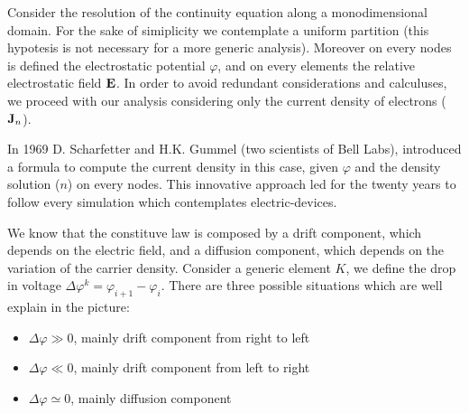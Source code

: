 Consider the resolution of the continuity equation along a monodimensional domain. For the sake of simiplicity we contemplate a uniform partition (this hypotesis is not necessary for a more generic analysis). Moreover on every nodes is defined the electrostatic potential $\varphi$, and on every elements the relative electrostatic field $\mathbf{E}$. In order to avoid redundant considerations and calculuses, we proceed with our analysis considering only the current density of electrons ($\mathbf{J}_n$).

 In 1969 D. Scharfetter and H.K. Gummel (two scientists of Bell Labs), introduced a formula to compute the current density in this case, given $\varphi$ and the density solution ($n$) on every nodes. This innovative approach led for the twenty years to follow every simulation which contemplates electric-devices. 
 
We know that the constituve law is composed by a drift component, which depends on the electric field, and a diffusion component, which depends on the variation of the carrier density. Consider a generic element $K$, we define the drop in voltage $\Delta \varphi^k=\varphi_{i+1}-\varphi_{i}$. There are three possible situations which are well explain in the picture:
\begin{itemize}
\item $\Delta \varphi \gg0$, mainly drift component from right to left 
\item $\Delta \varphi \ll0$, mainly drift component from left to right
\item $\Delta \varphi \simeq 0$, mainly diffusion component
\end{itemize} 
 
